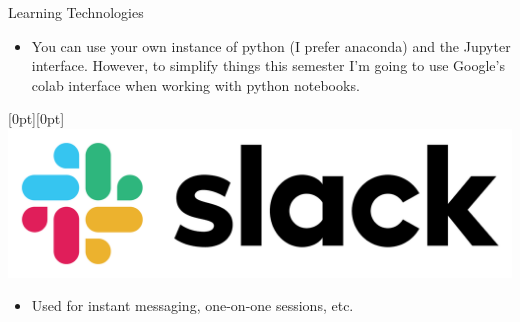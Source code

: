 \documentclass{wit-slides-2020}
\begin{document}
\begin{frame}[label=todo]{Learning Technologies}
\vspace{-9pt}
\begin{itemize}
\item
You can use your own  instance of python (I prefer anaconda) and the Jupyter interface. However, to simplify things this semester I'm going to use Google's colab interface when working with python notebooks.
\end{itemize}

\vspace{6pt}
\hfill \raisebox{9pt}[0pt][0pt]{\includegraphics[scale=.02]{pic/slack}}

\vspace{-12pt}
\begin{itemize}
\item
Used for instant messaging, one-on-one sessions, etc.
\end{itemize}
\end{frame}
\end{document}
